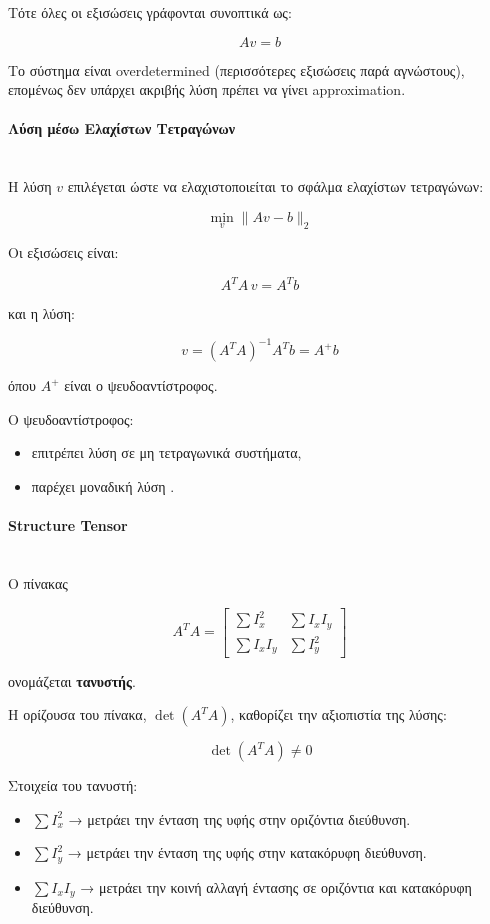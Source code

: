 \documentclass[12pt]{article}
\begin{document}
Τότε όλες οι εξισώσεις γράφονται συνοπτικά ως:

\[
A v = b
\]

Το σύστημα είναι overdetermined (περισσότερες εξισώσεις παρά αγνώστους), επομένως δεν υπάρχει ακριβής λύση πρέπει να γίνει approximation.




\paragraph{Λύση μέσω Ελαχίστων Τετραγώνων}
\mbox{}\\
Η λύση \(v\) επιλέγεται ώστε να ελαχιστοποιείται το σφάλμα ελαχίστων τετραγώνων:

\[
\min_{v} \|Av - b\|_2
\]

Οι εξισώσεις είναι:

\[
A^T A \, v = A^T b
\]

και η λύση:

\[
v = (A^T A)^{-1} A^T b = A^+ b
\]

όπου \(A^+\) είναι ο ψευδοαντίστροφος.  

Ο ψευδοαντίστροφος:

\begin{itemize}
  \item επιτρέπει λύση σε μη τετραγωνικά συστήματα,
  \item παρέχει μοναδική λύση .
\end{itemize}

\paragraph{Structure Tensor}
\mbox{}\\
Ο πίνακας

\[
A^T A =
\begin{bmatrix}
\sum I_x^2 & \sum I_x I_y \\
\sum I_x I_y & \sum I_y^2
\end{bmatrix}
\]

ονομάζεται \textbf{τανυστής}.

Η ορίζουσα του πίνακα, \(\det(A^T A)\), καθορίζει την αξιοπιστία της λύσης:

\[
\det(A^T A) \neq 0
\]

Στοιχεία του τανυστή:

\begin{itemize}
  \item \(\sum I_x^2\) → μετράει την ένταση της υφής στην οριζόντια διεύθυνση.
  \item \(\sum I_y^2\) → μετράει την ένταση της υφής στην κατακόρυφη διεύθυνση.
  \item \(\sum I_x I_y\) → μετράει την κοινή αλλαγή έντασης σε οριζόντια και κατακόρυφη διεύθυνση.
\end{itemize}
\end{document}
